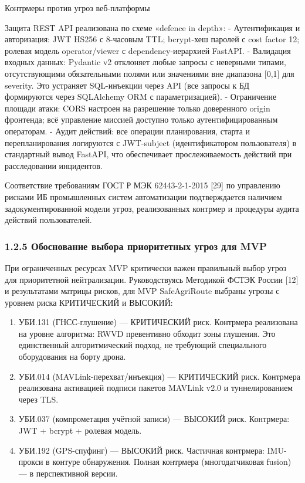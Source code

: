 \documentclass[14pt,a4paper]{extarticle}
\begin{document}
Контрмеры против угроз веб-платформы

Защита REST API реализована по схеме «defence in depth»: - Аутентификация и авторизация: JWT HS256 с 8-часовым TTL; bcrypt-хеш паролей с cost factor 12; ролевая модель operator/viewer с dependency-иерархией FastAPI. - Валидация входных данных: Pydantic v2 отклоняет любые запросы с неверными типами, отсутствующими обязательными полями или значениями вне диапазона {[}0,1{]} для severity. Это устраняет SQL-инъекции через API (все запросы к БД формируются через SQLAlchemy ORM с параметризацией). - Ограничение площади атаки: CORS настроен на разрешение только доверенного origin фронтенда; всё управление миссией доступно только аутентифицированным операторам. - Аудит действий: все операции планирования, старта и перепланирования логируются с JWT-subject (идентификатором пользователя) в стандартный вывод FastAPI, что обеспечивает прослеживаемость действий при расследовании инцидентов.

Соответствие требованиям ГОСТ Р МЭК 62443-2-1-2015 {[}29{]} по управлению рисками ИБ промышленных систем автоматизации подтверждается наличием задокументированной модели угроз, реализованных контрмер и процедуры аудита действий пользователей.

\hypertarget{ux43eux431ux43eux441ux43dux43eux432ux430ux43dux438ux435-ux432ux44bux431ux43eux440ux430-ux43fux440ux438ux43eux440ux438ux442ux435ux442ux43dux44bux445-ux443ux433ux440ux43eux437-ux434ux43bux44f-mvp}{%
\subsubsection{1.2.5 Обоснование выбора приоритетных угроз для MVP}\label{ux43eux431ux43eux441ux43dux43eux432ux430ux43dux438ux435-ux432ux44bux431ux43eux440ux430-ux43fux440ux438ux43eux440ux438ux442ux435ux442ux43dux44bux445-ux443ux433ux440ux43eux437-ux434ux43bux44f-mvp}}

При ограниченных ресурсах MVP критически важен правильный выбор угроз для приоритетной нейтрализации. Руководствуясь Методикой ФСТЭК России {[}12{]} и результатами матрицы рисков, для MVP SafeAgriRoute выбраны угрозы с уровнем риска КРИТИЧЕСКИЙ и ВЫСОКИЙ:

\begin{enumerate}
\def\labelenumi{\arabic{enumi}.}
\item
  УБИ.131 (ГНСС-глушение) --- КРИТИЧЕСКИЙ риск. Контрмера реализована на уровне алгоритма: RWVD превентивно обходит зоны глушения. Это единственный алгоритмический подход, не требующий специального оборудования на борту дрона.
\item
  УБИ.014 (MAVLink-перехват/инъекция) --- КРИТИЧЕСКИЙ риск. Контрмера реализована активацией подписи пакетов MAVLink v2.0 и туннелированием через TLS.
\item
  УБИ.037 (компрометация учётной записи) --- ВЫСОКИЙ риск. Контрмера: JWT + bcrypt + ролевая модель.
\item
  УБИ.192 (GPS-спуфинг) --- ВЫСОКИЙ риск. Частичная контрмера: IMU-прокси в контуре обнаружения. Полная контрмера (многодатчиковая fusion) --- в перспективной версии.
\end{enumerate}
\end{document}
